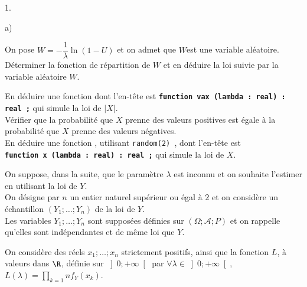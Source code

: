 \documentclass[11pt]{article}%
\begin{document}
\begin{noliste}{1.}
\begin{noliste}{a)}
 \setlength{\itemsep}{2mm}
\item On pose $W = -\dfrac{1}{\lambda}\ln(1-U)$ et on admet que $W$est
une
variable aléatoire. \\
Déterminer la fonction de répartition de $W$ et en déduire la loi
suivie par la variable aléatoire $W$. 
\item En déduire une fonction \Scilab{} dont l'en-tête est
\texttt{\textbf{function
vax (lambda : real) : real ;}} qui simule la loi de $\left|X\right|$.
\\
Vérifier que la probabilité que $X$ prenne des valeurs positives
est égale à la probabilité que $X$ prenne des valeurs négatives.
\\
En déduire une fonction \Scilab{}, utilisant \texttt{random(2) }, dont
l'en-tête est\\
 \texttt{\textbf{function x (lambda : real) : real ;}} qui simule la
loi de $X$.
\end{noliste}

On suppose, dans la suite, que le paramètre $\lambda$ est inconnu
et on souhaite l'estimer en utilisant la loi de $Y$. \\
On désigne par $n$ un entier naturel supérieur ou égal à $2$ et
on considère un échantillon $\left(Y_{1};\ldots;Y_{n}\right)$ de
la loi de $Y$. \\
Les variables $Y_{1};\ldots;Y_{n}$ sont supposées définies sur
$\left(\Omega;\mathcal{A};P\right)$
et on rappelle qu'elles sont indépendantes et de même loi que $Y$. 

\item On considère des réels $x_{1};\ldots;x_{n}$ strictement positifs,
ainsi que la fonction $L$, à valeurs dans $\R$, définie
sur $\left]0; + \infty\right[$ par $\forall\lambda\in\left]0; +
\infty\right[$, $L\left(\lambda\right) = { \prod_{k =
1}{n}f_{Y}\left(x_{k}\right)}$.


\end{noliste}
\end{document}
